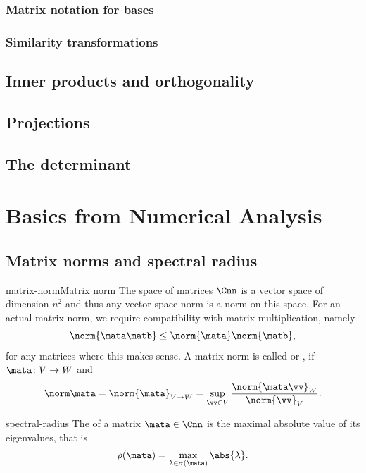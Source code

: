 \subsection{Matrix notation for bases}

\subsection{Similarity transformations}

\section{Inner products and orthogonality}

\section{Projections}

\section{The determinant}


\chapter{Basics from Numerical Analysis}


\section{Matrix norms and spectral radius}

\begin{Definition*}{matrix-norm}{Matrix norm}
  The space of matrices $\Cnn$ is a vector space of dimension $n^2$ and thus any vector space norm is a norm on this space. For an actual matrix norm, we require compatibility with matrix multiplication, namely
  \begin{gather}
    \norm{\mata\matb} \le \norm{\mata}\norm{\matb},
  \end{gather}
  for any matrices where this makes sense. A matrix norm is called  or , if $\mata\colon V\to W$ and
  \begin{gather}
    \norm\mata = \norm{\mata}_{V\to W} = \sup_{\vv\in V}\frac{\norm{\mata\vv}_W}{\norm{\vv}_V}.
  \end{gather}
\end{Definition*}

\begin{Definition}{spectral-radius}
  The  of a matrix $\mata\in\Cnn$ is the
  maximal absolute value of its eigenvalues, that is
  \begin{gather}
    \rho(\mata) = \max_{\lambda\in\sigma(\mata)} \abs{\lambda}.
  \end{gather}
\end{Definition}


